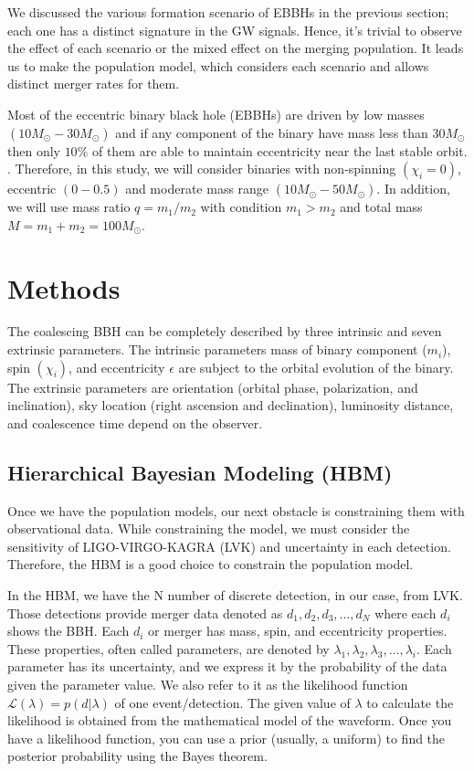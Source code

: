 \documentclass[twocolumn,prd,nofootinbib]{revtex4}
\begin{document}
We discussed the various formation scenario of EBBHs in the previous section; each one has a distinct signature in the GW signals. Hence, it's trivial to observe the effect of each scenario or the mixed effect on the merging population. It leads us to make the population model, which considers each scenario and allows distinct merger rates for them.

Most of the eccentric binary black hole (EBBHs) are driven by low masses $(10M_\odot-30M_\odot)$ and if any component of the binary have mass less than $30 M_\odot$ then only $10\%$ of them are able to maintain eccentricity near the last stable orbit.  \cite{mass_ecc_limit_2018}. Therefore,  in this study, we  will consider binaries with non-spinning $(\chi_i = 0)$, eccentric $(0-0.5)$ and moderate mass range $(10M_\odot-50M_\odot)$. In addition, we will use mass ratio $q=m_1/m_2$ with condition $m_1>m_2$ and total mass $M=m_1+m_2=100M_\odot$.



\section{Methods}
\label{sec:methods}

The coalescing BBH can be completely described by three intrinsic and seven extrinsic parameters. The intrinsic parameters mass of binary component ($m_i$), spin $( \chi_i)$, and eccentricity $\epsilon$  are subject to the orbital evolution of the binary. The extrinsic parameters are orientation (orbital phase, polarization, and inclination), sky location (right ascension and declination), luminosity distance, and coalescence time depend on the observer.



\subsection{Hierarchical Bayesian Modeling (HBM)}



Once we have the population models, our next obstacle is constraining them with observational data. While constraining the model, we must consider the sensitivity of LIGO-VIRGO-KAGRA (LVK) and uncertainty in each detection. Therefore, the HBM is a good choice to constrain the population model.

In the HBM, we have the N number of discrete detection, in our case, from LVK. Those detections provide merger data denoted as $d_1,d_2,d_3,...,d_N$ where each $d_i$ shows the BBH. Each $d_i$ or merger has mass, spin, and eccentricity properties. These properties, often called parameters, are denoted by $\lambda_1,\lambda_2,\lambda_3,...,\lambda_i$. Each parameter has its uncertainty, and we express it by the probability of the data given the parameter value. We also refer to it as the likelihood function $\mathcal{L}(\lambda)=p(d|\lambda)$ of one event/detection. The given value of $\lambda$ to calculate the likelihood is obtained from the mathematical model of the waveform. Once you have a likelihood function, you can use a prior (usually, a uniform) to find the posterior probability using the Bayes theorem.
\end{document}
